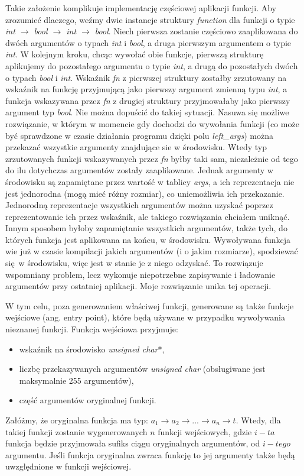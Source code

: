 \documentclass[declaration,shortabstract]{iithesis}
\begin{document}
Takie założenie komplikuje implementację częściowej aplikacji funkcji. Aby 
zrozumieć dlaczego, weźmy dwie instancje struktury \textit{function} dla 
funkcji o typie \textit{int $\rightarrow$ bool $\rightarrow$ int 
$\rightarrow$ bool}. Niech pierwsza zostanie częściowo zaaplikowana do dwóch 
argumentów o typach \textit{int} i \textit{bool}, a druga pierwszym argumentem
o typie \textit{int}. W kolejnym kroku, chcąc wywołać obie funkcje, 
pierwszą strukturę aplikujemy do pozostałego argumentu o typie \textit{int}, a
drugą do pozostałych dwóch o typach \textit{bool} i \textit{int}. Wskaźnik \textit
{fn} z pierwszej struktury zostałby zrzutowany na wskaźnik na funkcję 
przyjmującą jako pierwszy argument zmienną typu \textit{int}, a funkcja 
wskazywana przez \textit{fn} z drugiej struktury przyjmowałaby jako pierwszy 
argument typ \textit{bool}. Nie można dopuścić do takiej sytuacji. Nasuwa się 
możliwe rozwiązanie, w którym w momencie gdy dochodzi do wywołania funkcji (co 
może być sprawdzone w czasie działania programu dzięki polu 
\textit{left\_args}) można przekazać wszystkie argumenty znajdujące sie w 
środowisku. Wtedy typ zrzutowanych funkcji wskazywanych przez \textit{fn} byłby 
taki sam, niezależnie od tego do ilu dotychczas argumentów zostały zaaplikowane.
Jednak argumenty w środowisku są zapamiętane przez wartość w tablicy \textit
{args}, a ich reprezentacja nie jest jednorodna (mogą mieć różny rozmiar),
co uniemożliwia ich przekazanie.
Jednorodną reprezentacje wszystkich argumentów można uzyskać poprzez 
reprezentowanie ich przez wskaźnik, ale takiego rozwiązania chciałem uniknąć.
Innym sposobem byłoby zapamiętanie wszystkich argumentów, także tych,
do których funkcja jest aplikowana na końcu, w środowisku. 
Wywoływana funkcja wie już w czasie 
kompilacji jakich argumentów (i o jakim rozmiarze), spodziewać się w środowisku,
więc jest w stanie je z niego odzyskać. To rozwiązuje wspomniany 
problem, lecz wykonuje niepotrzebne zapisywanie i ładowanie argumentów 
przy ostatniej aplikacji. Moje rozwiązanie unika tej operacji. 

W tym celu, poza generowaniem właściwej funkcji, generowane są także funkcje 
wejściowe (ang. entry point), które będą używane w przypadku wywoływania 
nieznanej funkcji. 
Funkcja wejściowa przyjmuje: 
\begin{itemize}
  \item wskaźnik na środowisko \textit{unsigned char$\ast$},
  \item liczbę przekazywanych argumentów \textit{unsigned char} 
  (obsługiwane jest maksymalnie 255 argumentów),
  \item część argumentów oryginalnej funkcji.
\end{itemize}
Załóżmy, że oryginalna funkcja ma typ: $a_1 \rightarrow a_2 \rightarrow ...
\rightarrow a_n \rightarrow t$. Wtedy, dla takiej funkcji zostanie wygenerowanych $n$ funkcji 
wejściowych, gdzie $i-ta$ funkcja będzie przyjmowała sufiks ciągu oryginalnych
argumentów, od $i-tego$ argumentu. Jeśli funkcja oryginalna zwraca funkcję to 
jej argumenty także będą uwzględnione w funkcji wejściowej.
\end{document}
